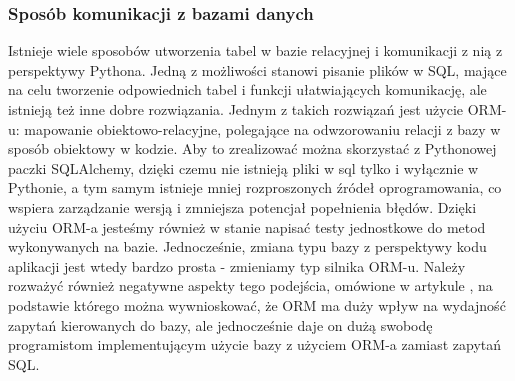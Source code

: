 \subsubsection{Sposób komunikacji z bazami danych}
Istnieje wiele sposobów utworzenia tabel w bazie relacyjnej i komunikacji z nią z perspektywy Pythona. Jedną z możliwości stanowi pisanie plików w SQL, mające na celu tworzenie odpowiednich tabel i funkcji ułatwiających komunikację, ale istnieją też inne dobre rozwiązania. Jednym z takich rozwiązań jest użycie ORM-u: mapowanie obiektowo-relacyjne, polegające na odwzorowaniu relacji z bazy w sposób obiektowy w kodzie. Aby to zrealizować można skorzystać z Pythonowej paczki SQLAlchemy, dzięki czemu nie istnieją pliki w sql tylko i wyłącznie w Pythonie, a tym samym istnieje mniej rozproszonych źródeł oprogramowania, co wspiera zarządzanie wersją i zmniejsza potencjał popełnienia błędów. Dzięki użyciu ORM-a jesteśmy również w stanie napisać testy jednostkowe do metod wykonywanych na bazie. Jednocześnie, zmiana typu bazy z perspektywy kodu aplikacji jest wtedy bardzo prosta - zmieniamy typ silnika ORM-u. Należy rozważyć również  negatywne aspekty tego podejścia, omówione w artykule \cite{ImpactOfORM}, na podstawie którego można wywnioskować, że ORM ma duży wpływ na wydajność zapytań kierowanych do bazy, ale jednocześnie daje on dużą swobodę programistom implementującym użycie bazy z użyciem ORM-a zamiast zapytań SQL.